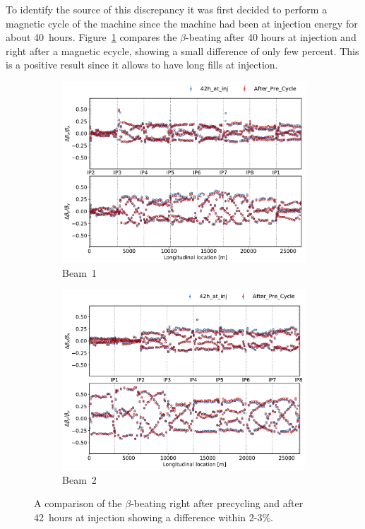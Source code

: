 \documentclass[a4paper]{cernatsnote}
\begin{document}
To identify the source of this discrepancy it was first decided to perform a magnetic cycle of the machine since the machine had been at injection energy for about 40~hours. Figure~\ref{fig:before_after_pre_cycle} compares the $\beta$-beating after 40 hours at injection and right after a magnetic ecycle, showing a small difference of only few percent. This is a positive result since it allows to have long fills at injection. 

\begin{figure}[ht]
\begin{subfigure}{.5\textwidth}
  \centering
  \includegraphics[width=.99\linewidth]{plots/beam1/beta_beat_before_after_pre_beam1.pdf}  
  \caption{Beam~1}
\end{subfigure}
\begin{subfigure}{.5\textwidth}
  \centering
  \includegraphics[width=.99\linewidth]{plots/beam2/beta_beat_before_after_pre_beam2.pdf}  
  \caption{Beam~2}
\end{subfigure}
\caption{A comparison of the $\beta$-beating right after precycling and after 42~hours at injection showing a difference within 2-3\%.}
\label{fig:before_after_pre_cycle}
\end{figure}
\end{document}
